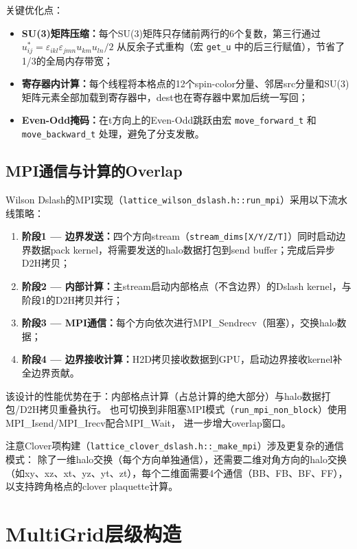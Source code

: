 \documentclass[11pt,a4paper]{article}
\begin{document}
关键优化点：
\begin{itemize}
    \item \textbf{SU(3)矩阵压缩：}每个SU(3)矩阵只存储前两行的6个复数，第三行通过 $u^*_{ij} = \varepsilon_{ikl}\varepsilon_{jmn}u_{km}u_{ln}/2$ 从反余子式重构（宏 \texttt{get\_u} 中的后三行赋值），节省了1/3的全局内存带宽；
    \item \textbf{寄存器内计算：}每个线程将本格点的12个spin-color分量、邻居src分量和SU(3)矩阵元素全部加载到寄存器中，dest也在寄存器中累加后统一写回；
    \item \textbf{Even-Odd掩码：}在t方向上的Even-Odd跳跃由宏 \texttt{move\_forward\_t} 和 \texttt{move\_backward\_t} 处理，避免了分支发散。
\end{itemize}

\subsection{MPI通信与计算的Overlap}

Wilson Dslash的MPI实现（\texttt{lattice\_wilson\_dslash.h::run\_mpi}）采用以下流水线策略：

\begin{enumerate}
    \item \textbf{阶段1 — 边界发送：}四个方向stream（\texttt{stream\_dims[X/Y/Z/T]}）同时启动边界数据pack kernel，将需要发送的halo数据打包到send buffer；完成后异步D2H拷贝；
    \item \textbf{阶段2 — 内部计算：}主stream启动内部格点（不含边界）的Dslash kernel，与阶段1的D2H拷贝并行；
    \item \textbf{阶段3 — MPI通信：}每个方向依次进行MPI\_Sendrecv（阻塞），交换halo数据；
    \item \textbf{阶段4 — 边界接收计算：}H2D拷贝接收数据到GPU，启动边界接收kernel补全边界贡献。
\end{enumerate}

该设计的性能优势在于：内部格点计算（占总计算的绝大部分）与halo数据打包/D2H拷贝重叠执行。
也可切换到非阻塞MPI模式（\texttt{run\_mpi\_non\_block}）使用MPI\_Isend/MPI\_Irecv配合MPI\_Wait，
进一步增大overlap窗口。

注意Clover项构建（\texttt{lattice\_clover\_dslash.h::\_make\_mpi}）涉及更复杂的通信模式：
除了一维halo交换（每个方向单独通信），还需要二维对角方向的halo交换
（如xy、xz、xt、yz、yt、zt），每个二维面需要4个通信（BB、FB、BF、FF），
以支持跨角格点的clover plaquette计算。

\section{MultiGrid层级构造}
\end{document}
